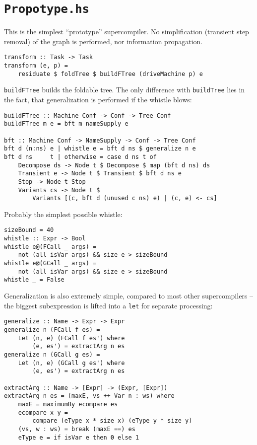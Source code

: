 \section{\texttt{Propotype.hs}}

This is the simplest ``prototype'' supercompiler.
No simplification (transient step removal) of the graph is performed, nor information propagation.
\begin{lstlisting}[name=prototype]
transform :: Task -> Task
transform (e, p) =
	residuate $ foldTree $ buildFTree (driveMachine p) e
\end{lstlisting}

\texttt{buildFTree} builds the foldable tree. 
The only difference with \texttt{buildTree} lies in the fact,
that generalization is performed if the whistle blows:
\begin{lstlisting}[name=prototype]
buildFTree :: Machine Conf -> Conf -> Tree Conf
buildFTree m e = bft m nameSupply e

bft :: Machine Conf -> NameSupply -> Conf -> Tree Conf
bft d (n:ns) e | whistle e = bft d ns $ generalize n e
bft d ns     t | otherwise = case d ns t of
	Decompose ds -> Node t $ Decompose $ map (bft d ns) ds
	Transient e -> Node t $ Transient $ bft d ns e
	Stop -> Node t Stop
	Variants cs -> Node t $ 
		Variants [(c, bft d (unused c ns) e) | (c, e) <- cs]
\end{lstlisting}

Probably the simplest possible whistle:
\begin{lstlisting}[name=prototype]
sizeBound = 40
whistle :: Expr -> Bool
whistle e@(FCall _ args) = 
	not (all isVar args) && size e > sizeBound
whistle e@(GCall _ args) = 
	not (all isVar args) && size e > sizeBound
whistle _ = False
\end{lstlisting}

Generalization is also extremely simple, compared to most other supercompilers --
the biggest subexpression is lifted into a \texttt{let} for separate processing:
\begin{lstlisting}[name=prototype]
generalize :: Name -> Expr -> Expr
generalize n (FCall f es) =
	Let (n, e) (FCall f es') where 
		(e, es') = extractArg n es
generalize n (GCall g es) =
	Let (n, e) (GCall g es') where 
		(e, es') = extractArg n es

extractArg :: Name -> [Expr] -> (Expr, [Expr])
extractArg n es = (maxE, vs ++ Var n : ws) where
	maxE = maximumBy ecompare es
	ecompare x y = 
		compare (eType x * size x) (eType y * size y)
	(vs, w : ws) = break (maxE ==) es
	eType e = if isVar e then 0 else 1
\end{lstlisting}
